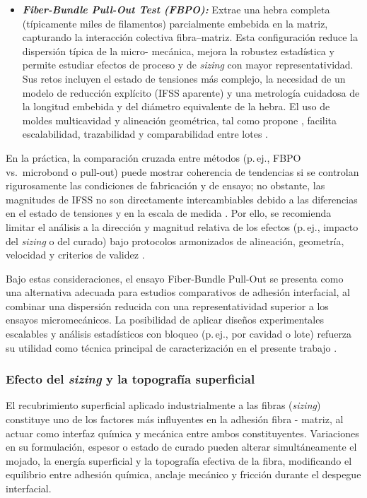 \begin{itemize}
    \item \textbf{\textit{Fiber-Bundle Pull-Out Test (FBPO):}} Extrae una hebra completa (típicamente
    miles de filamentos) parcialmente embebida en la matriz, capturando la interacción colectiva
    fibra–matriz. Esta configuración reduce la dispersión típica de la micro- mecánica, mejora la
    robustez estadística y permite estudiar efectos de proceso y de \textit{sizing} con mayor
    representatividad. Sus retos incluyen el estado de tensiones más complejo, la necesidad de un
    modelo de reducción explícito (IFSS aparente) y una metrología cuidadosa de la longitud embebida
    y del diámetro equivalente de la hebra. El uso de moldes multicavidad y alineación geométrica, tal
    como propone \cite{DeLeon2022}, facilita escalabilidad, trazabilidad y comparabilidad entre lotes
    \cite{DeLeon2022,Liu2021}.
\end{itemize}

En la práctica, la comparación cruzada entre métodos (p.\,ej., FBPO vs.\ microbond o pull-out) puede
mostrar coherencia de tendencias si se controlan rigurosamente las condiciones de fabricación y de
ensayo; no obstante, las magnitudes de IFSS no son directamente intercambiables debido a las
diferencias en el estado de tensiones y en la escala de medida \cite{Zhou2016, Fischer2020}. Por ello,
se recomienda limitar el análisis a la dirección y magnitud relativa de los efectos (p.\,ej., impacto
del \textit{sizing} o del curado) bajo protocolos armonizados de alineación, geometría, velocidad y
criterios de validez \cite{ISO19375,DINSPEC19289}.

\noindent
Bajo estas consideraciones, el ensayo Fiber-Bundle Pull-Out se presenta como una alternativa adecuada
para estudios comparativos de adhesión interfacial, al combinar una dispersión reducida con una
representatividad superior a los ensayos micromecánicos. La posibilidad de aplicar diseños
experimentales escalables y análisis estadísticos con bloqueo (p.\,ej., por cavidad o lote) refuerza
su utilidad como técnica principal de caracterización en el presente trabajo
\cite{Fischer2020,Liu2021,DeLeon2022}.

\subsubsection{Efecto del \textit{sizing} y la topografía superficial}

El recubrimiento superficial aplicado industrialmente a las fibras (\textit{sizing}) constituye uno
de los factores más influyentes en la adhesión fibra - matriz, al actuar como interfaz química y
mecánica entre ambos constituyentes. Variaciones en su formulación, espesor o estado de curado pueden
alterar simultáneamente el mojado, la energía superficial y la topografía efectiva de la fibra,
modificando el equilibrio entre adhesión química, anclaje mecánico y fricción durante el despegue
interfacial.

